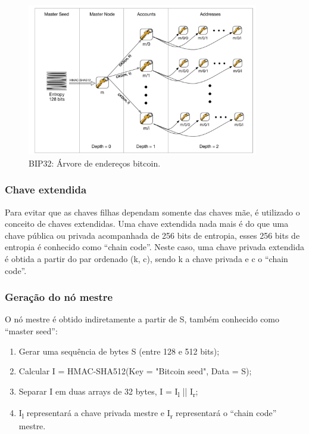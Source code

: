 \begin{figure}[ht]
\centering
\includegraphics[width=0.9\textwidth]{Cap1/hd_tree}
\caption{BIP32: Árvore de endereços bitcoin.}
\label{hd_tree}
\end{figure}

\subsubsection{Chave extendida}

Para evitar que as chaves filhas dependam somente das chaves mãe, é utilizado o conceito de chaves extendidas. Uma chave extendida nada mais é do que uma chave pública ou privada acompanhada de 256 bits de entropia, esses 256 bits de entropia é conhecido como ``chain code''. Neste caso, uma chave privada extendida é obtida a partir do par ordenado (k, c), sendo k a chave privada e c o ``chain code''.

\subsubsection{Geração do nó mestre}

O nó mestre é obtido indiretamente a partir de S, também conhecido como ``master seed'':

\begin{enumerate}
\item Gerar uma sequência de bytes S (entre 128 e 512 bits);
\item Calcular I = HMAC-SHA512(Key = "Bitcoin seed", Data = S);
\item Separar I em duas arrays de 32 bytes, I = I\textsubscript{l} || I\textsubscript{r};
\item I\textsubscript{l} representará a chave privada mestre e I\textsubscript{r} representará o ``chain code''  mestre.
\end{enumerate}

